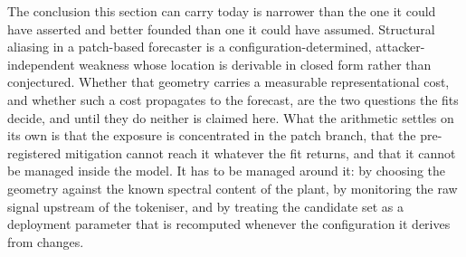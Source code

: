 The conclusion this section can carry today is narrower than the one it could have asserted and better founded than one it could have assumed. Structural aliasing in a patch-based forecaster is a configuration-determined, attacker-independent weakness whose location is derivable in closed form rather than conjectured. Whether that geometry carries a measurable representational cost, and whether such a cost propagates to the forecast, are the two questions the fits decide, and until they do neither is claimed here. What the arithmetic settles on its own is that the exposure is concentrated in the patch branch, that the pre-registered mitigation cannot reach it whatever the fit returns, and that it cannot be managed inside the model. It has to be managed around it: by choosing the geometry against the known spectral content of the plant, by monitoring the raw signal upstream of the tokeniser, and by treating the candidate set as a deployment parameter that is recomputed whenever the configuration it derives from changes.
\endgroup
